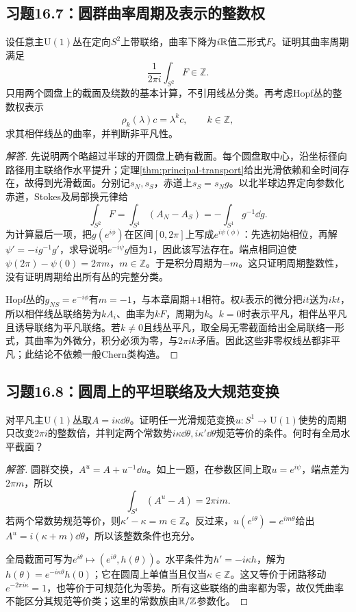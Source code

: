 \subsection*{习题16.7：圆群曲率周期及表示的整数权}
设任意主$\mathrm U(1)$丛在定向$S^2$上带联络，曲率下降为$i\mathbb{R}$值二形式$F$。证明其曲率周期满足
\[
 \frac1{2\pi i}\int_{S^2}F\in\mathbb Z.
\]
只用两个圆盘上的截面及绕数的基本计算，不引用线丛分类。再考虑Hopf丛的整数权表示
\[
 \rho_k(\lambda)c=\lambda^kc,\qquad k\in\mathbb Z,
\]
求其相伴线丛的曲率，并判断非平凡性。
\begin{proof}[解答]
先说明两个略超过半球的开圆盘上确有截面。每个圆盘取中心，沿坐标径向路径用主联络作水平提升；定理\ref{thm:principal-transport}给出光滑依赖和全时间存在，故得到光滑截面。分别记$s_N,s_S$，赤道上$s_S=s_Ng$。以北半球边界定向参数化赤道，Stokes及局部换元律给
\[
 \int_{S^2}F=\int_{S^1}(A_N-A_S)=-\int_{S^1}g^{-1}\dd g.
\]
为计算最后一项，把$g(e^{i\phi})$在区间$[0,2\pi]$上写成$e^{i\psi(\phi)}$：先选初始相位，再解$\psi'=-ig^{-1}g'$，求导说明$e^{-i\psi}g$恒为1，因此该写法存在。端点相同迫使$\psi(2\pi)-\psi(0)=2\pi m$，$m\in\mathbb Z$。于是积分周期为$-m$。这只证明周期整数性，没有证明周期给出所有丛的完整分类。

Hopf丛的$g_{NS}=e^{-i\phi}$有$m=-1$，与本章周期$+1$相符。权$k$表示的微分把$it$送为$ikt$，所以相伴线丛联络势为$kA_i$、曲率为$kF$，周期为$k$。$k=0$时表示平凡，相伴丛平凡且诱导联络为平凡联络。若$k\ne0$且线丛平凡，取全局无零截面给出全局联络一形式，其曲率为外微分，积分必须为零，与$2\pi ik$矛盾。因此这些非零权线丛都非平凡；此结论不依赖一般Chern类构造。
\end{proof}

\subsection*{习题16.8：圆周上的平坦联络及大规范变换}
对平凡主$\mathrm U(1)$丛取$A=i\kappa\dd\theta$。证明任一光滑规范变换$u:S^1\to\mathrm U(1)$使势的周期只改变$2\pi i$的整数倍，并判定两个常数势$i\kappa\dd\theta,i\kappa'\dd\theta$规范等价的条件。何时有全局水平截面？
\begin{proof}[解答]
圆群交换，$A^u=A+u^{-1}\dd u$。如上一题，在参数区间上取$u=e^{i\psi}$，端点差为$2\pi m$，所以
\[
 \int_{S^1}(A^u-A)=2\pi im.
\]
若两个常数势规范等价，则$\kappa'-\kappa=m\in\mathbb Z$。反过来，$u(e^{i\theta})=e^{im\theta}$给出$A^u=i(\kappa+m)\dd\theta$，所以该整数条件也充分。

全局截面可写为$e^{i\theta}\mapsto(e^{i\theta},h(\theta))$。水平条件为$h'=-i\kappa h$，解为$h(\theta)=e^{-i\kappa\theta}h(0)$；它在圆周上单值当且仅当$\kappa\in\mathbb Z$。这又等价于闭路移动$e^{-2\pi i\kappa}=1$，也等价于可规范化为零势。所有这些联络的曲率都为零，故仅凭曲率不能区分其规范等价类；这里的常数族由$\mathbb{R}/\mathbb Z$参数化。
\end{proof}
